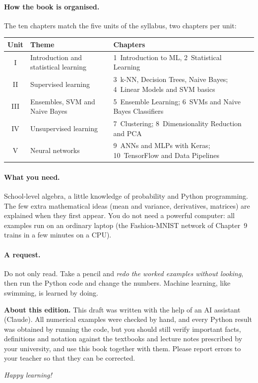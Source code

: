 \paragraph{How the book is organised.} The ten chapters match the five units of the syllabus, two chapters per unit:

\begin{center}
\begin{tabular}{@{}cp{5.2cm}p{6.3cm}@{}}
\toprule
\textbf{Unit} & \textbf{Theme} & \textbf{Chapters}\\
\midrule
I & Introduction and statistical learning & 1~Introduction to ML, 2~Statistical Learning\\
II & Supervised learning & 3~k-NN, Decision Trees, Naive Bayes; 4~Linear Models and SVM basics\\
III & Ensembles, SVM and Naive Bayes & 5~Ensemble Learning; 6~SVMs and Naive Bayes Classifiers\\
IV & Unsupervised learning & 7~Clustering; 8~Dimensionality Reduction and PCA\\
V & Neural networks & 9~ANNs and MLPs with Keras; 10~TensorFlow and Data Pipelines\\
\bottomrule
\end{tabular}
\end{center}

\paragraph{What you need.} School-level algebra, a little knowledge of probability and Python programming. The few extra mathematical ideas (mean and variance, derivatives, matrices) are explained when they first appear. You do not need a powerful computer: all examples run on an ordinary laptop (the Fashion-MNIST network of Chapter~9 trains in a few minutes on a CPU).

\paragraph{A request.} Do not only read. Take a pencil and \emph{redo the worked examples without looking}, then run the Python code and change the numbers. Machine learning, like swimming, is learned by doing.

\begin{warning}
\textbf{About this edition.} This draft was written with the help of an AI assistant (Claude). All numerical examples were checked by hand, and every Python result was obtained by running the code, but you should still verify important facts, definitions and notation against the textbooks and lecture notes prescribed by your university, and use this book together with them. Please report errors to your teacher so that they can be corrected.
\end{warning}

\vspace{1em}
\begin{flushright}
\emph{Happy learning!}
\end{flushright}
